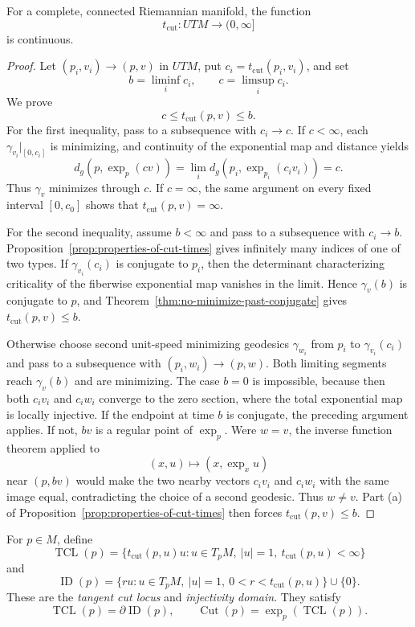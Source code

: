 \begin{theorem}
\label{thm:cut-time-continuous}
For a complete, connected Riemannian manifold, the function
\[
t_{\mathrm{cut}}\colon UTM\longrightarrow(0,\infty]
\]
is continuous.

\begin{proof}
\sketch Let $(p_i,v_i)\to(p,v)$ in $UTM$, put
$c_i=t_{\mathrm{cut}}(p_i,v_i)$, and set
\[
b=\liminf_i c_i,
\qquad c=\limsup_i c_i.
\]
We prove
\[
c\leq t_{\mathrm{cut}}(p,v)\leq b.
\]
For the first inequality, pass to a subsequence with $c_i\to c$. If
$c<\infty$, each $\gamma_{v_i}|_{[0,c_i]}$ is minimizing, and continuity of
the exponential map and distance yields
\[
d_g(p,\exp_p(cv))
=\lim_i d_g(p_i,\exp_{p_i}(c_iv_i))
=c.
\]
Thus $\gamma_v$ minimizes through $c$. If $c=\infty$, the same argument on
every fixed interval $[0,c_0]$ shows that $t_{\mathrm{cut}}(p,v)=\infty$.

For the second inequality, assume $b<\infty$ and pass to a subsequence with
$c_i\to b$. Proposition~\ref{prop:properties-of-cut-times} gives infinitely
many indices of one of two types. If $\gamma_{v_i}(c_i)$ is conjugate to $p_i$,
then the determinant characterizing criticality of the fiberwise exponential
map vanishes in the limit. Hence $\gamma_v(b)$ is conjugate to $p$, and
Theorem~\ref{thm:no-minimize-past-conjugate} gives
$t_{\mathrm{cut}}(p,v)\leq b$.

Otherwise choose second unit-speed minimizing geodesics
$\gamma_{w_i}$ from $p_i$ to $\gamma_{v_i}(c_i)$ and pass to a subsequence
with $(p_i,w_i)\to(p,w)$. Both limiting segments reach $\gamma_v(b)$ and are
minimizing. The case $b=0$ is impossible, because then both $c_iv_i$ and
$c_iw_i$ converge to the zero section, where the total exponential map is
locally injective. If the endpoint at time $b$ is conjugate, the preceding
argument applies. If not, $bv$ is a regular point of $\exp_p$. Were $w=v$,
the inverse function
theorem applied to
\[
(x,u)\longmapsto(x,\exp_xu)
\]
near $(p,bv)$ would make the two nearby vectors $c_iv_i$ and $c_iw_i$ with
the same image equal, contradicting the choice of a second geodesic. Thus
$w\ne v$. Part (a) of Proposition~\ref{prop:properties-of-cut-times} then
forces $t_{\mathrm{cut}}(p,v)\leq b$.
\end{proof}
\end{theorem}

For $p\in M$, define
\[
\operatorname{TCL}(p)
=\{t_{\mathrm{cut}}(p,u)u:
u\in T_pM,\ |u|=1,\ t_{\mathrm{cut}}(p,u)<\infty\}
\]
and
\[
\operatorname{ID}(p)
=\{ru:u\in T_pM,\ |u|=1,\ 0<r<t_{\mathrm{cut}}(p,u)\}\cup\{0\}.
\]
These are the \emph{tangent cut locus} and \emph{injectivity domain}. They
satisfy
\[
\operatorname{TCL}(p)=\partial\operatorname{ID}(p),
\qquad
\operatorname{Cut}(p)=\exp_p(\operatorname{TCL}(p)).
\]

